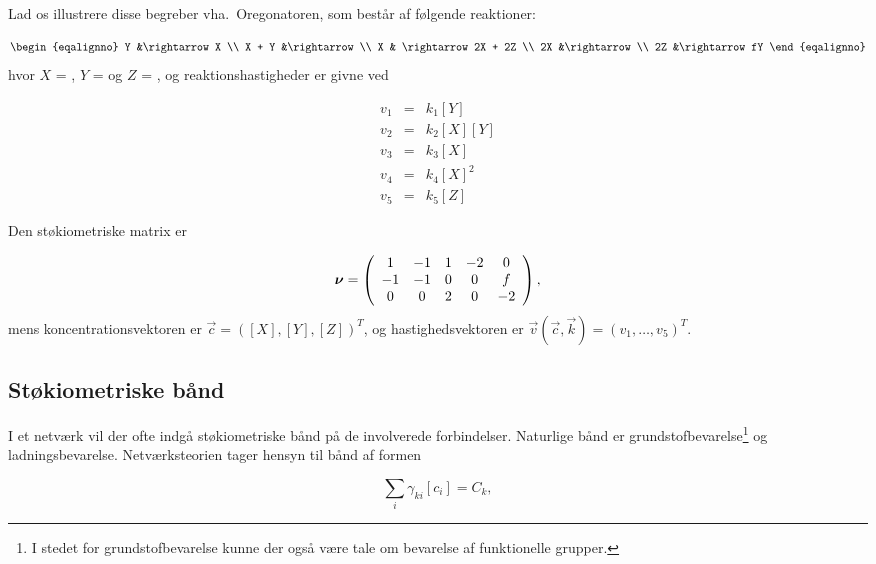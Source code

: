 \vspace{4.0mm}
Lad os illustrere disse begreber vha.\ Oregonatoren, som best{\aa}r af
f{\o}lgende reaktioner:

\begin{subequations}
\label{clarke:oregon}
\begin{eqalignno}
Y &\rightarrow X   \\
X + Y &\rightarrow \\
X & \rightarrow  2X + 2Z   \\
2X &\rightarrow   \\
2Z &\rightarrow fY  
\end{eqalignno}
\end{subequations}
hvor $X$ = , $Y$ =  og $Z$ = , og
reaktionshastigheder er givne ved 

\begin{subequations}
\begin{eqnarray}
v_1 &=& k_1[Y] \\
v_2 &=& k_2[X][Y] \\
v_3 &=& k_3[X] \\
v_4 &=& k_4[X]^2 \\
v_5 &=& k_5[Z]
\end{eqnarray}
\end{subequations}

Den st{\o}kiometriske matrix er

\[
\mbox{\boldmath $\nu$} = \left(
\begin{array}{ccccc}
1 &-1& 1& -2& 0 \\
-1 & -1 & 0 & 0 & f \\
0 & 0 & 2 & 0 & -2 
\end{array} \right),
\]
mens koncentrationsvektoren er $\vec{c} = ([X], [Y], [Z])^T$, og
hastighedsvektoren er $\vec{v}(\vec{c}, \vec{k}) = (v_1, \ldots, v_5)^T$.

\subsection{St{\o}kiometriske b{\aa}nd}
I et netv{\ae}rk vil der ofte indg{\aa} st{\o}kiometriske
b{\aa}nd p{\aa} de involverede for\-bind\-elser. Naturlige
b{\aa}nd er grundstofbevarelse\footnote{I stedet for
grundstofbevarelse kunne der ogs{\aa} v{\ae}re tale om
bevarelse af funktionelle grupper.} og ladningsbevarelse.
Net\-v{\ae}rks\-teo\-rien tager hensyn til b{\aa}nd af
formen

\[
 \sum_i \gamma_{ki} [c_i] = C_k,
\]

